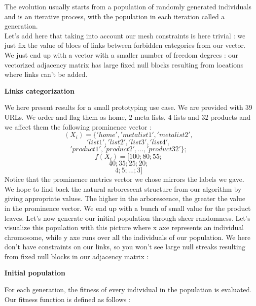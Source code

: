 \documentclass{iSWAGArticle}
\begin{document}
  The evolution usually starts from a population of randomly generated individuals and is an iterative process, with the population in each iteration called a generation.
  \\\newline
  Let's add here that taking into account our mesh constraints is here trivial : we just fix the value of blocs of links between forbidden categories from our
  vector. We just end up with a vector with a smaller number of freedom degrees : our vectorized adjacency matrix has large fixed null blocks resulting from locations where links can't be added.
  \begin{center}
  \textbf{\large Links categorization}
  \end{center}
  \begin{center}
  \end{center}
  We here present results for a small prototyping use case.
  We are provided with 39 URLs. We order and flag them as home, 2 meta lists, 4 lists and 32 products and we affect them
  the following prominence vector :
  $$
  \left(X_i\right)=\{'home','metalist1','metalist2',
  $$
  $$
  'list1','list2','list3','list4',
  $$
  $$
  'product1','product2',...,'product32'\};
  $$
  $$
  f\left(X_i\right) = [100;80;55;$$
  $$
  40;35;25;20;
  $$
  $$
  4;5;...;3]
  $$
  Notice that the prominence metrics vector we chose mirrors the labels we gave. We hope to find back the natural arborescent structure from our algorithm by giving appropriate values.
  The higher in the arborescence, the greater the value in the prominence vector. We end up with a bunch of small value for the product leaves. Let's now generate our initial population through sheer randomness. Let's visualize this population with this picture where x axe represents an individual chromosome, 
  while y axe runs over all the individuals of our population. We here don't have constraints on our links, so you won't see large null streaks resulting from fixed null blocks in our adjacency matrix :
  \\\newline
  \begin{center}
  \textbf{\large Initial population}
  \end{center}
  \begin{center}
  \end{center}
  For each generation, the fitness of every individual in the population is evaluated. Our fitness function is defined as follows :
\end{document}
